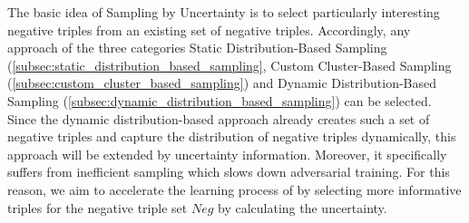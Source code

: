 The basic idea of Sampling by Uncertainty is to select particularly interesting negative triples from an existing set of negative triples.
Accordingly, any approach of the three categories Static Distribution-Based Sampling (\autoref{subsec:static_distribution_based_sampling}, Custom Cluster-Based Sampling (\autoref{subsec:custom_cluster_based_sampling}) and Dynamic Distribution-Based Sampling (\autoref{subsec:dynamic_distribution_based_sampling}) can be selected.
Since the dynamic distribution-based approach \kbgan already creates such a set of negative triples and capture the distribution of negative triples dynamically, this approach will be extended by uncertainty information.
Moreover, it specifically suffers from inefficient sampling which slows down adversarial training.
For this reason, we aim to accelerate the learning process of \kbgan by selecting more informative triples for the negative triple set $Neg$ by calculating the uncertainty.

